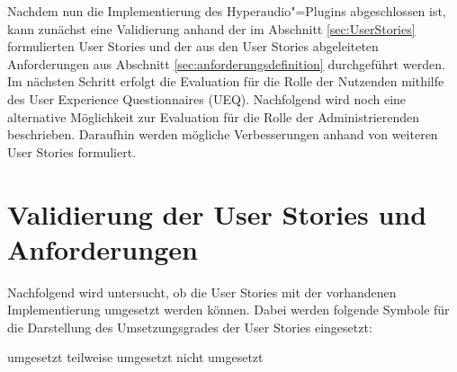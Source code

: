 \label{cap:evaluation}
Nachdem nun die Implementierung des Hyperaudio"=Plugins abgeschlossen ist, kann zunächst eine Validierung anhand der im Abschnitt \ref{sec:UserStories} formulierten User Stories und der aus den User Stories abgeleiteten Anforderungen aus Abschnitt \ref{sec:anforderungsdefinition} durchgeführt werden. Im nächsten Schritt erfolgt die Evaluation für die Rolle der Nutzenden mithilfe des User Experience Questionnaires (UEQ). Nachfolgend wird noch eine alternative Möglichkeit zur Evaluation für die Rolle der Administrierenden beschrieben. Daraufhin werden mögliche Verbesserungen anhand von weiteren User Stories formuliert.



\section{Validierung der User Stories und Anforderungen}
Nachfolgend wird untersucht, ob die User Stories mit der vorhandenen Implementierung umgesetzt werden können. Dabei werden folgende Symbole für die Darstellung des Umsetzungsgrades der User Stories eingesetzt:

\begin{center}
\Checkmark  \nobreakspace\nobreakspace umgesetzt \qquad \Asterisk \nobreakspace\nobreakspace teilweise umgesetzt \qquad \XSolidBrush \nobreakspace\nobreakspace nicht umgesetzt\\
\end{center}

